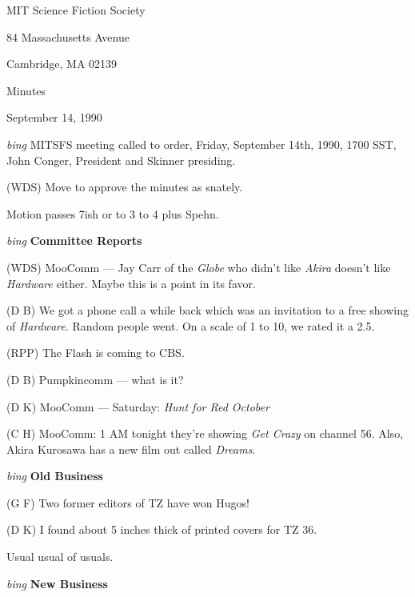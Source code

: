 \setlength{\topmargin}{-0.5in}
\setlength{\oddsidemargin}{0.0in}
\setlength{\evensidemargin}{0.0in}
\setlength{\textheight}{9in}
\setlength{\textwidth}{6.5in}



\begin{center}
MIT Science Fiction Society

84 Massachusetts Avenue

Cambridge, MA 02139

\vspace{0.2in}
Minutes

September 14, 1990

\end{center}
 
\vspace{0.15in}
{\em bing\/}  MITSFS meeting called to order, Friday, September 14th, 1990,
1700 SST, John Conger, President and Skinner presiding.

(WDS) Move to approve the minutes as snately.

Motion passes 7ish or to 3 to 4 plus Spehn.

\vspace{0.15in}
{\em bing\/} {\bf Committee Reports\/}

(WDS) MooComm --- Jay Carr of the {\em Globe} who didn't like {\em Akira}
doesn't like {\em Hardware} either.  Maybe this is a point in its favor.

(D B) We got a phone call a while back which was an invitation to a free
showing of {\em Hardware}.  Random people went.  On a scale of 1 to 10, we
rated it a 2.5.

(RPP) The Flash is coming to CBS.

(D B) Pumpkincomm --- what is it?

(D K) MooComm --- Saturday: {\em Hunt for Red October}

(C H) MooComm: 1 AM tonight they're showing {\em Get Crazy} on channel 56.
Also, Akira Kurosawa has a new film out called {\em Dreams}.

\vspace{.15in}
{\em bing\/} {\bf Old Business\/}

(G F) Two former editors of TZ have won Hugos!

(D K) I found about 5 inches thick of printed covers for TZ 36.

Usual usual of usuals.

\vspace{0.15in}
{\em bing\/} {\bf New Business\/}

